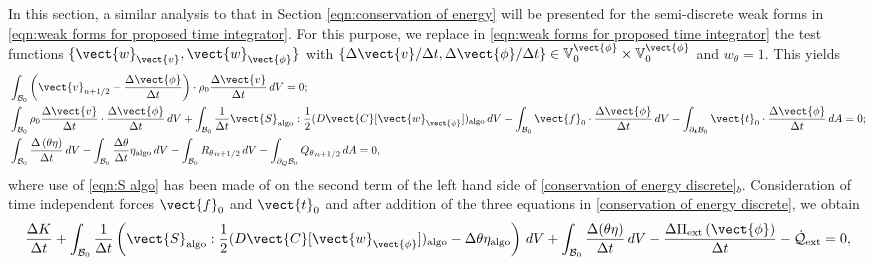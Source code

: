 {{In this section, a similar analysis to that in Section \eqref{eqn:conservation of energy} will be presented for the semi-discrete weak forms in \eqref{eqn:weak forms for proposed time integrator}. 
For this purpose, we replace in \eqref{eqn:weak forms for proposed time integrator} the test functions $\{\vect{w}_{\vect{v}},\vect{w}_{\vect{\phi}}\}$  with $\{\Delta{\vect{v}}/\Delta t,{\Delta{\vect{\phi}}}/\Delta t\}\in\mathbb{V}_0^{\vect{\phi}}\times\mathbb{V}_0^{\vect{\phi}}$ and $w_{\theta}=1$. 
This yields
%
\begin{equation}\label{conservation of energy discrete}
\begin{aligned}
&\int_{\mathcal{B}_0}\left(\vect{v}_{n+1/2} - \frac{\Delta\vect{\phi}}{\Delta t}\right)\cdot\rho_0\frac{\Delta{\vect{v}}}{\Delta t}\,dV=0;\\
%
&\int_{\mathcal{B}_0}\rho_0\frac{\Delta\vect{v}}{\Delta t}\cdot\frac{\Delta\vect{\phi}}{\Delta t}\,dV + \int_{\mathcal{B}_0}\frac{1}{\Delta t}\vect{S}_{\text{algo}}:\frac{1}{2}(D\vect{C}[\vect{w}_{\vect{\phi}}])_{\text{algo}}\,dV-  \int_{\mathcal{B}_0}\vect{f}_0\cdot\frac{\Delta{\vect{\phi}}}{\Delta t}\,dV-
\int_{\partial_{\boldsymbol{t}}\mathcal{B}_0}\vect{t}_0\cdot\frac{\Delta{\vect{\phi}}}{\Delta t}\,dA=0 ;\\
%
&\int_{\mathcal{B}_0}\frac{\Delta\left(\theta\eta\right)}{{\Delta t}}\,dV - \int_{\mathcal{B}_0}\frac{\Delta \theta}{\Delta t}\eta_{\text{algo}}\,dV - \int_{\mathcal{B}_0}{R_{\theta}}_{n+1/2}\,dV - \int_{\partial_{Q}\mathcal{B}_{0}}{Q_{\theta}}_{n+1/2}\,dA=0,
%
\end{aligned}
\end{equation}
%
where use of \eqref{eqn:S algo} has been made of on the second term of the left hand side of \eqref{conservation of energy discrete}$_b$.
Consideration of time independent forces $\vect{f}_0$ and $\vect{t}_0$ and after addition of the three equations in \eqref{conservation of energy discrete}, we obtain
%
\begin{equation}\label{conservation of energy discrete II}
\begin{aligned} 
%
\frac{\Delta K}{\Delta t} + \int_{\mathcal{B}_0}\frac{1}{{\Delta t}}\left(\vect{S}_{\text{algo}}:\frac{1}{2}(D\vect{C}[\vect{w}_{\vect{\phi}}])_{\text{algo}} - 
%
{\Delta \theta}\eta_{\text{algo}}\right)\,dV + \int_{\mathcal{B}_0}\frac{\Delta(\theta\eta)}{{\Delta t}}\,dV
%
- \frac{\Delta\Pi_{\text{ext}}\left(\vect{\phi}\right)}{{\Delta t}} - \dot{\mathcal{Q}}_{\text{ext}}=0,

\end{aligned}
\end{equation}}}
